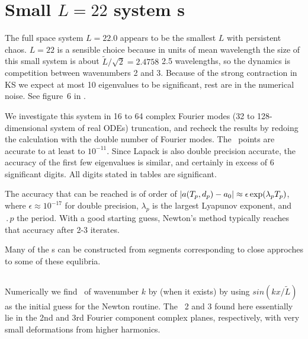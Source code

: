 %


\section{Small $L=22$ system {\rpo s}}

The full space \KS system $L = 22.0$ 
appears to be the smallest $L$ with persistent chaos.  
$L=22$ is a sensible choice because in units of mean wavelength
the size of this small system is about $ \tilde{L}/\sqrt{2}= 2.4758$
2.5 wavelengths, 
so the dynamics is competition between wavenumbers
2 and 3.
Because of the strong contraction in KS we expect at most 10 eigenvalues to be
significant, rest are in the numerical noise. See figure~6 in
.

We investigate this system in 16 to 64 complex Fourier modes
(32 to 128-dimensional system of real ODEs) truncation, and recheck the results 
by redoing the calculation with the double number of Fourier modes.
The \eqv\ points are accurate to at least to $10^{-11}$. Since
Lapack is also double precision accurate, the accuracy of the first
few eigenvalues is similar, and certainly in
excess of 6 significant digits.
%
All digits stated in tables are significant.

The accuracy that can be reached is of order of
$|a({T_{p}},d_p) - a_0| \approx \epsilon \exp(\lambda_p {T_{p}})$,
where $\epsilon \approx 10^{-17}$ for double precision,
$\lambda_p$ is the largest Lyapunov exponent, 
and $\period{p}$ the period.  With a good starting guess,
Newton's method
typically reaches that accuracy after 2-3 iterates.

Many of the \rpo s can be constructed from segments corresponding to
close approches to some of these equlibria.

\subsection{\Eqva}

Numerically we find \eqva\ of wavenumber $k$ by (when it exists)
by using $sin( k x /\tilde{L})$ as the initial guess for the Newton routine.
The \eqva\ {\nameit}2 and {\nameit}3 found here
essentially lie in the 2nd and 3rd Fourier component complex planes,
respectively, with very
small deformations from higher harmonics.

